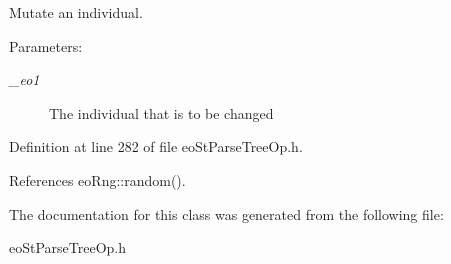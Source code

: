 Mutate an individual. 

\begin{Desc}
\item[Parameters:]
\begin{description}
\item[{\em \_\-eo1}]The individual that is to be changed \end{description}
\end{Desc}


Definition at line 282 of file eo\-St\-Parse\-Tree\-Op.h.

References eo\-Rng::random().

The documentation for this class was generated from the following file:\begin{CompactItemize}
\item 
eo\-St\-Parse\-Tree\-Op.h\end{CompactItemize}

